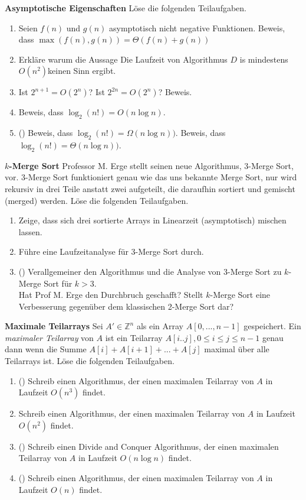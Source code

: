 \documentclass{uebung_cs}
\begin{document}
\begin{aufgabe}
	\textbf{Asymptotische Eigenschaften}
	Löse die folgenden Teilaufgaben.
	\begin{enumerate}
		\item Seien $f(n)$ und $g(n)$ asymptotisch nicht negative Funktionen.
		Beweis, dass $\max(f(n),g(n)) = \Theta(f(n) + g(n))$
		\item Erkläre warum die Aussage \glqq Die Laufzeit von Algorithmus $D$ is mindestens $O(n^2)$\grqq keinen Sinn ergibt.
		\item Ist $2^{n+1} = O(2^n)$? Ist $2^{2n} = O(2^n)$? Beweis.
		\item Beweis, dass $\log_2(n!) = O(n \log n)$.
		\item (\hard) Beweis, dass $\log_2(n!) = \Omega(n\log n))$. Beweis, dass $\log_2(n!) = \Theta(n\log n))$.
	\end{enumerate}
\end{aufgabe}

\begin{aufgabe}
	\textbf{$k$-Merge Sort}
	Professor M. Erge stellt seinen neue Algorithmus, 3-Merge Sort, vor.
	3-Merge Sort funktioniert genau wie das uns bekannte Merge Sort, nur wird rekursiv in drei Teile anstatt zwei aufgeteilt, die daraufhin sortiert und gemischt (merged) werden.
	Löse die folgenden Teilaufgaben.
	\begin{enumerate}
		\item Zeige, dass sich drei sortierte Arrays in Linearzeit (asymptotisch) mischen lassen.
		\item Führe eine Laufzeitanalyse für 3-Merge Sort durch.
		\item (\hard) Verallgemeiner den Algorithmus und die Analyse von 3-Merge Sort zu $k$-Merge Sort für $k>3$.\\
		Hat Prof M. Erge den Durchbruch geschafft?
		Stellt $k$-Merge Sort eine Verbesserung gegenüber dem klassischen 2-Merge Sort dar?
	\end{enumerate}
\end{aufgabe}

\begin{aufgabe}
	\textbf{Maximale Teilarrays}
	Sei $A' \in \mathbb{Z}^n$ als ein Array $A[0, ..., n-1]$ gespeichert.
	Ein \textit{maximaler Teilarray} von $A$ ist ein Teilarray $A[i..j], 0\leq i\leq j\leq n-1$ genau dann wenn die Summe $A[i] + A[i+1] + ... + A[j]$ maximal über alle Teilarrays ist.
	Löse die folgenden Teilaufgaben.
	\begin{enumerate}
		\item (\warmup) Schreib einen Algorithmus, der einen maximalen Teilarray von $A$ in Laufzeit $O(n^3)$ findet.
		\item Schreib einen Algorithmus, der einen maximalen Teilarray von $A$ in Laufzeit $O(n^2)$ findet.
		\item (\hard) Schreib einen Divide and Conquer Algorithmus, der einen maximalen Teilarray von $A$ in Laufzeit $O(n\log n)$ findet.
		\item (\veryhard) Schreib einen Algorithmus, der einen maximalen Teilarray von $A$ in Laufzeit $O(n)$ findet.
	\end{enumerate}
\end{aufgabe}
\end{document}

